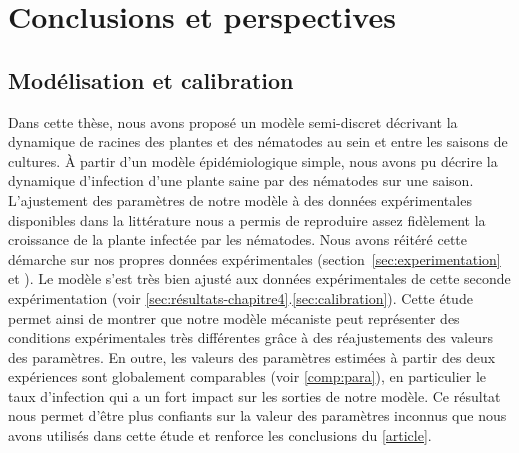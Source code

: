 	
\renewcommand{\tablename}{Tableau}
\renewcommand{\figurename}{Figure}
\newcommand{\sncom}[1]{{\color{black}{\textsf{[para  #1]}}}}
\newcommand{\sncomc}[1]{{\color{Blue}{\textsf{[com :  #1]}}}}
\chapter{Conclusions et perspectives} \label{chapter_5}
	
	\minitoc
	\newpage
		
\section{Modélisation et calibration}
	Dans cette thèse, nous avons proposé un modèle semi-discret décrivant la dynamique de racines des plantes et des nématodes au sein et entre les saisons de
cultures.  À partir d’un modèle  épidémiologique simple,  nous avons pu  décrire la dynamique d’infection d’une plante saine par
des nématodes sur une saison. L’ajustement des paramètres de notre modèle à des données expérimentales disponibles dans la littérature \citep{Ehwaeti1998} nous a permis de
reproduire assez fidèlement la croissance de la plante infectée par les nématodes. Nous avons  réitéré cette démarche sur nos propres données expérimentales (section~\ref{sec:experimentation}  et ). Le modèle s'est très bien ajusté  aux données expérimentales de cette seconde expérimentation (voir \ref{sec:résultats-chapitre4}.\autoref{sec:calibration}).  Cette étude permet ainsi de montrer que notre modèle mécaniste peut représenter des conditions expérimentales très différentes grâce à des réajustements des valeurs des paramètres. En outre, les valeurs des paramètres estimées à partir des deux expériences sont globalement comparables (voir  \autoref{comp:para}), en particulier le taux d'infection qui a un fort impact sur les sorties de notre modèle.  Ce résultat nous permet d'être plus confiants sur la valeur des paramètres inconnus que nous avons utilisés dans cette étude et renforce les conclusions du \autoref{article}.
	  

